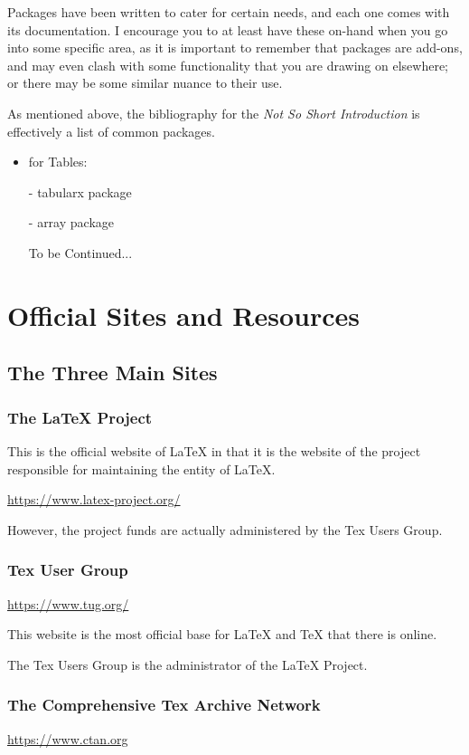 \documentclass[11pt, oneside]{memoir}
\begin{document}
Packages have been written to cater for certain needs, and each one comes with its documentation. I encourage you to at least have these on-hand when you go into some specific area, as it is important to remember that packages are add-ons, and may even clash with some functionality that you are drawing on elsewhere; or there may be some similar nuance to their use.

As mentioned above, the bibliography for the \emph{Not So Short Introduction} is effectively a list of common packages.

\begin{itemize}
    \item for Tables:
    \item[-] tabularx package
    \item[-] array package
    \item[] To be Continued...
\end{itemize}

\chapter{Official Sites and Resources}

\section{The Three Main Sites}
\subsection{The LaTeX Project}

This is the official website of LaTeX in that it is the website of the project responsible for maintaining the entity of LaTeX.

\url{https://www.latex-project.org/}

However, the project funds are actually administered by the Tex Users Group.

\subsection{Tex User Group}

\url{https://www.tug.org/}

This website is the most official base for LaTeX and TeX that there is online. 

The Tex Users Group is the administrator of the LaTeX Project.

\subsection{The Comprehensive Tex Archive Network}
\url{https://www.ctan.org}
\end{document}
